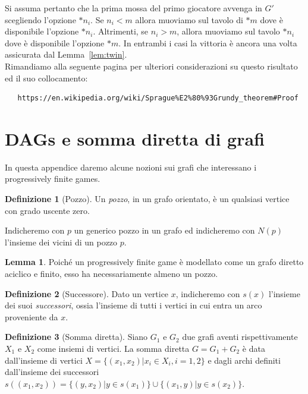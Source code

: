 \documentclass[a4paper, 10pt]{report}
\theoremstyle{definition} %
\newtheorem{lemma}{Lemma}
\newtheorem{definizione}{Definizione}
\begin{document}
Si assuma pertanto che la prima mossa del primo giocatore avvenga in $G'$
scegliendo l'opzione $*n_i$.
Se $n_i < m$ allora muoviamo sul tavolo di $*m$
dove è disponibile l'opzione $*n_{i}$.
Altrimenti, se $n_i > m$,
allora muoviamo sul tavolo $*n_i$ dove è disponibile l'opzione $*m$.
In entrambi i casi la vittoria è ancora una volta assicurata
dal Lemma~\ref{lem:twin}.\\


Rimandiamo alla seguente pagina per ulteriori considerazioni su questo risultato ed il suo collocamento:

\begin{verbatim}
   https://en.wikipedia.org/wiki/Sprague%E2%80%93Grundy_theorem#Proof
\end{verbatim}


\section*{DAGs e somma diretta di grafi}
\label{app_a}

In questa appendice daremo alcune nozioni sui grafi che interessano i
progressively finite games. 

\begin{definizione}[Pozzo]
Un \emph{pozzo}, in un grafo orientato, \`e un qualsiasi vertice con grado
uscente zero.
\end{definizione}

Indicheremo con $p$ un generico pozzo in un grafo ed indicheremo con
$N(p)$ l'insieme dei vicini di un pozzo $p$.

\begin{lemma}\label{pozzo}
Poich\'e un progressively finite game \`e modellato come un grafo diretto
aciclico e finito, esso ha necessariamente almeno un pozzo.
\end{lemma}

\begin{definizione}[Successore]
Dato un vertice $x$, indicheremo con $s(x)$ l'insieme dei suoi
\emph{successori}, ossia l'insieme di tutti i  vertici in cui entra un arco
proveniente da $x$.
\end{definizione}

\begin{definizione}[Somma diretta]
Siano $G_1$ e $G_2$ due grafi aventi rispettivamente $X_1$ e $X_2$ come
insiemi di vertici. La somma diretta $G = G_1 + G_2$ \`e data dall'insieme di
vertici $X=\{(x_1, x_2) \vert x_i \in X_i, i = 1, 2\}$ e dagli archi definiti
dall'insieme dei successori $s((x_1, x_2)) = \{(y, x_2) \vert y \in s(x_1)\}
\cup \{(x_1, y) \vert y \in s(x_2)\}$.
\end{definizione}
\end{document}
